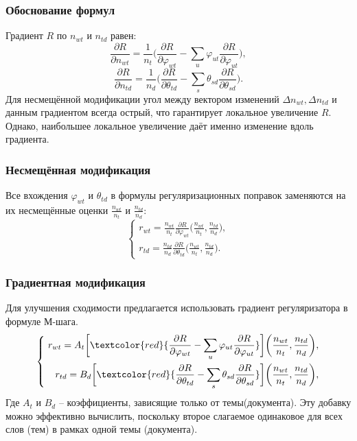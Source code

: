 \documentclass[utf8]{beamer}
\renewcommand{\phi}{\varphi}
\begin{document}
	
\begin{frame}
\frametitle{Обоснование формул}
Градиент $R$ по $n_{wt}$ и $n_{td}$ равен:
\[
\frac{\partial{R}}{\partial{n_{wt}}} = \frac{1}{n_t} \bigg(\frac{\partial{R}}{\partial{\phi_{wt}}} - \sum\limits_u \phi_{ut} \frac{\partial{R}}{\partial{\phi_{ut}}}\bigg),
\]
\[
\frac{\partial{R}}{\partial{n_{td}}} = \frac{1}{n_d} \bigg( \frac{\partial{R}}{\partial{\theta_{td}}} - \sum\limits_s \theta_{sd} \frac{\partial{R}}{\partial{\theta_{sd}}} \bigg).
\]
Для несмещённой модификации угол между вектором изменений $\Delta n_{wt}, \Delta n_{td}$ и данным градиентом всегда острый, что гарантирует локальное увеличение $R$. Однако, наибольшее локальное увеличение даёт именно изменение вдоль градиента.
\end{frame}


\begin{frame}
\frametitle{Несмещённая модификация}
Все вхождения $\phi_{wt}$ и $\theta_{td}$ в формулы регуляризационных поправок заменяются на их несмещённые оценки $\frac{n_{wt}}{n_t}$ и $\frac{n_{td}}{n_d}$:
\[
\left\{
	\begin{aligned}
		r_{wt} =  \frac{n_{wt}}{n_t} \frac{\partial{R}}{\partial{\phi_{wt}}} \bigg(\frac{n_{wt}}{n_t}, \frac{n_{td}}{n_d}\bigg),\\
		r_{td} = \frac{n_{td}}{n_d} \frac{\partial{R}}{\partial{\theta_{td}}} \bigg(\frac{n_{wt}}{n_t}, \frac{n_{td}}{n_d}\bigg).
	\end{aligned}
\right.
\]
\end{frame}

	
\begin{frame}
\frametitle{Градиентная модификация}
Для улучшения сходимости предлагается использовать градиент регуляризатора в формуле М-шага.
\[
\left\{\
	\begin{aligned}
		r_{wt} =  A_t \bigg[\textcolor{red} {\frac{\partial{R}}{\partial{\phi_{wt}}} - \sum\limits_u \phi_{ut} \frac{\partial{R}}{\partial{\phi_{ut}}} }\bigg] \bigg(\frac{n_{wt}}{n_t}, \frac{n_{td}}{n_d}\bigg),\\
		r_{td} =  B_d \bigg[ \textcolor{red} {\frac{\partial{R}}{\partial{\theta_{td}}} - \sum\limits_s \theta_{sd} \frac{\partial{R}}{\partial{\theta_{sd}}} }\bigg] \bigg(\frac{n_{wt}}{n_t}, \frac{n_{td}}{n_d}\bigg),
	\end{aligned}
\right.
\]
Где $A_t$ и $B_d$ -- коэффициенты, зависящие только от темы(документа). Эту добавку можно эффективно вычислить, поскольку второе слагаемое одинаковое для всех слов (тем) в рамках одной темы (документа).
\end{frame}
\end{document}
